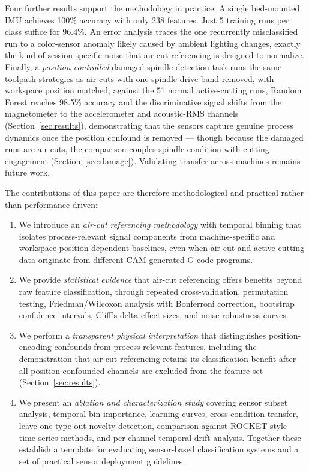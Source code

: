 Four further results support the methodology in practice. A single bed-mounted IMU achieves 100\% accuracy with only 238 features. Just 5 training runs per class suffice for 96.4\%. An error analysis traces the one recurrently misclassified run to a color-sensor anomaly likely caused by ambient lighting changes, exactly the kind of session-specific noise that air-cut referencing is designed to normalize. Finally, a \emph{position-controlled} damaged-spindle detection task runs the same toolpath strategies as air-cuts with one spindle drive band removed, with workspace position matched; against the 51 normal active-cutting runs, Random Forest reaches 98.5\% accuracy and the discriminative signal shifts from the magnetometer to the accelerometer and acoustic-RMS channels (Section~\ref{sec:results}), demonstrating that the sensors capture genuine process dynamics once the position confound is removed --- though because the damaged runs are air-cuts, the comparison couples spindle condition with cutting engagement (Section~\ref{sec:damage}). Validating transfer across machines remains future work.

The contributions of this paper are therefore methodological and practical rather than performance-driven:
\begin{enumerate}
    \item We introduce an \emph{air-cut referencing methodology} with temporal binning that isolates process-relevant signal components from machine-specific and workspace-position-dependent baselines, even when air-cut and active-cutting data originate from different CAM-generated G-code programs.
    \item We provide \emph{statistical evidence} that air-cut referencing offers benefits beyond raw feature classification, through repeated cross-validation, permutation testing, Friedman/Wilcoxon analysis with Bonferroni correction, bootstrap confidence intervals, Cliff's delta effect sizes, and noise robustness curves.
    \item We perform a \emph{transparent physical interpretation} that distinguishes position-encoding confounds from process-relevant features, including the demonstration that air-cut referencing retains its classification benefit after all position-confounded channels are excluded from the feature set (Section~\ref{sec:results}).
    \item We present an \emph{ablation and characterization study} covering sensor subset analysis, temporal bin importance, learning curves, cross-condition transfer, leave-one-type-out novelty detection, comparison against ROCKET-style time-series methods, and per-channel temporal drift analysis. Together these establish a template for evaluating sensor-based classification systems and a set of practical sensor deployment guidelines.
\end{enumerate}

